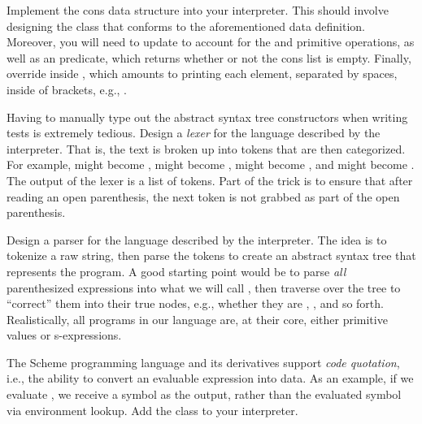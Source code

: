 \enlargethispage{2\baselineskip}
Implement the cons data structure into your interpreter. This should involve designing the  class that conforms to the aforementioned data definition. Moreover, you will need to update  to account for the  and  primitive operations, as well as an  predicate, which returns whether or not the cons list is empty. Finally, override  inside , which amounts to printing each element, separated by spaces, inside of brackets, e.g., \ttt{[$l_0, l_1, \ldots, l_{n-1}]$}.

\newpage %
Having to manually type out the abstract syntax tree constructors when writing tests is extremely tedious. Design a \emph{lexer} for the language described by the interpreter. That is, the text is broken up into tokens that are then categorized. For example, \ttt{\q{}(\q{}} might become ,  might become ,  might become , and  might become . The output of the lexer is a list of tokens. Part of the trick is to ensure that after reading an open parenthesis, the next token is not grabbed as part of the open parenthesis.

Design a parser for the language described by the interpreter. The idea is to tokenize a raw string, then parse the tokens to create an abstract syntax tree that represents the program. A good starting point would be to parse \emph{all} parenthesized expressions into what we will call , then traverse over the tree to ``correct'' them into their true nodes, e.g., whether they are , , and so forth. Realistically, all programs in our language are, at their core, either primitive values or s-expressions.

The Scheme programming language and its derivatives support \emph{code quotation}, i.e., the ability to convert an evaluable expression into data. As an example, if we evaluate , we receive a symbol as the output, rather than the evaluated symbol via environment lookup. Add the  class to your interpreter.


